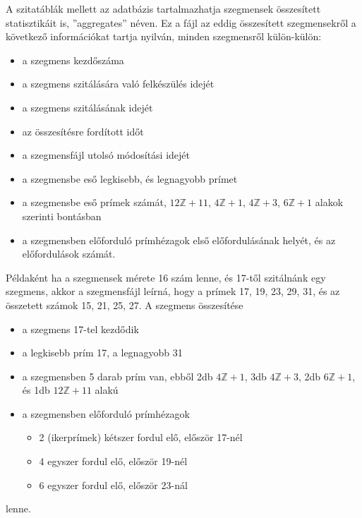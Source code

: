 A szitatáblák mellett az adatbázis tartalmazhatja szegmensek összesített
statisztikáit is, ''aggregates'' néven. Ez a fájl az eddig összesített
szegmensekről a következő információkat tartja nyilván,
minden szegmensről külön-külön:
\begin{itemize}
\item a szegmens kezdőszáma
\item a szegmens szitálására való felkészülés idejét
\item a szegmens szitálásának idejét
\item az összesítésre fordított időt
\item a szegmensfájl utolsó módosítási idejét
\item a szegmensbe eső legkisebb, és legnagyobb prímet
\item a szegmensbe eső prímek számát,
$12\mathbb{Z}+11$, $4\mathbb{Z}+1$, $4\mathbb{Z}+3$, $6\mathbb{Z}+1$ alakok szerinti bontásban
\item a szegmensben előforduló prímhézagok első előfordulásának helyét,
és az előfordulások számát.
\end{itemize}

Példaként ha a szegmensek mérete 16 szám lenne,
és 17-től szitálnánk egy szegmens, akkor a szegmensfájl
leírná, hogy a prímek 17, 19, 23, 29, 31,
és az összetett számok 15, 21, 25, 27.
A szegmens összesítése
\begin{itemize}
\item a szegmens 17-tel kezdődik
\item a legkisebb prím 17, a legnagyobb 31
\item a szegmensben 5 darab prím van,
	ebből 2db $4\mathbb{Z}+1$,
	3db $4\mathbb{Z}+3$, 2db $6\mathbb{Z}+1$,
	és 1db $12\mathbb{Z}+11$ alakú
\item a szegmensben előforduló prímhézagok
\begin{itemize}
\item 2 (ikerprímek) kétszer fordul elő, először 17-nél
\item 4 egyszer fordul elő, először 19-nél
\item 6 egyszer fordul elő, először 23-nál
\end{itemize}
\end{itemize}
lenne.

